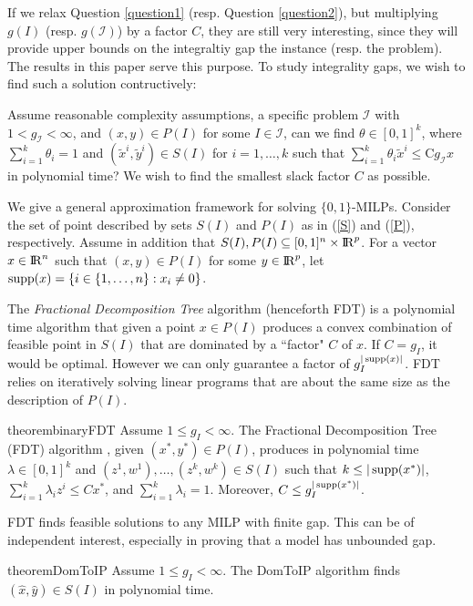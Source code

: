 If we relax Question \ref{question1} (resp. Question \ref{question2}), but multiplying $g(I)$ (resp. $g(\mathcal{I})$) by a factor $C$, they are still very interesting, since they will provide upper bounds on the integraltiy gap the instance (resp. the problem). The results in this paper serve this purpose.
\fi
To study integrality gaps, we wish to find such a solution contructively:
\begin{question}\label{question2}
	Assume reasonable complexity assumptions, a specific problem $\mathcal{I}$ with  $1<g_{\mathcal{I}}<\infty$, and $(x,y)\in P(I)$ for some $I\in \mathcal{I}$, can we find $\theta \in [0,1]^k$, where $\sum_{i=1}^{k}\theta_i =1$ and $(\tilde{x}^i,\tilde{y}^i)\in S(I)$ for $i=1,\ldots,k$ such that $\sum_{i=1}^{k}\theta_i \tilde{x}^i\leq $C$ g_{\mathcal{I}}x$ in polynomial time? We wish to find the smallest slack factor $C$ as possible.
\end{question}

We give a general approximation framework for solving $\{0,1\}$-MILPs.  Consider the set of point described by sets $S(I)$ and $P(I)$ as in (\ref{S}) and (\ref{P}), respectively. Assume in addition that $S(I),P(I)\subseteq [0,1]^n\times {\rm I\!R}^p$. For a vector $x\in {\rm I\!R}^n$ such that $(x,y)\in P(I)$ for some $y\in {\rm I\!R}^p$, let $\operatorname{supp}(x)= \{i \in \{1,\ldots,n\}: x_i \neq 0\}$. 


The \textit{Fractional Decomposition Tree} algorithm (henceforth FDT) is a polynomial time algorithm that given a point $x\in P(I)$ produces a convex combination of feasible point in $S(I)$ that are dominated by a ``factor" $C$ of $x$. If $C = g_I$, it would be optimal. However we can only guarantee a factor of $g_I^{|\operatorname{supp}(x)|}$. FDT relies on iteratively solving linear programs that are about the same size as the description of $P(I)$.

\begin{restatable}{theorem}{binaryFDT}
	\label{binaryFDT}
	Assume $1\leq g_I 	<\infty$. 	
	The Fractional Decomposition Tree (FDT) algorithm , given $(x^*,y^*)\in P(I)$, produces in polynomial time $\lambda\in [0,1]^k$ and $(z^1,w^1),\ldots,(z^k,w^k) \in S(I)$ such that $k\leq |\operatorname{supp}(x^*)|$, $\sum_{i=1}^{k}\lambda_i z^i\leq Cx^*$, and $\sum_{i=1}^{k}\lambda_i = 1$. Moreover, $C\leq g_I^{|\operatorname{supp}(x^*)|}$.
\end{restatable}

FDT finds feasible solutions to any MILP with finite gap. This can be of independent interest, especially in proving that a model has unbounded gap.
\begin{restatable}{theorem}{DomToIP}
	\label{domtoIP}
	Assume $1\leq g_I < \infty$. The DomToIP algorithm finds $(\hat{x},\hat{y})\in S(I)$ in polynomial time.
\end{restatable}

